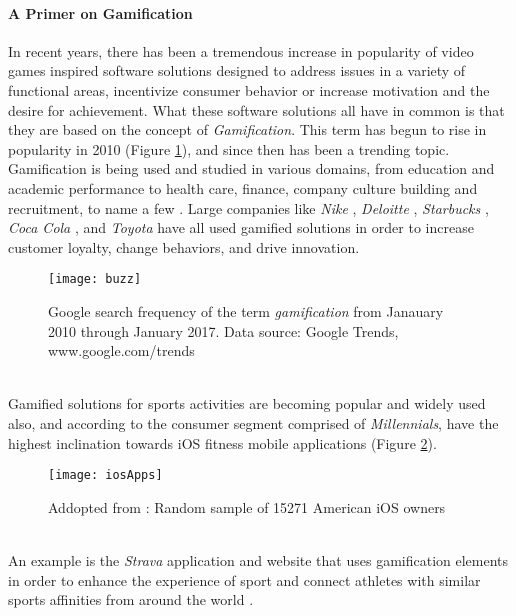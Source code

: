 \paragraph{A Primer on Gamification}
In recent years, there has been a tremendous increase in popularity of video games inspired software solutions designed to address issues in a variety of functional areas, incentivize consumer behavior or increase motivation and the desire for achievement. What these software solutions all have in common is that they are based on the concept of \textit{Gamification}. This term has begun to rise in popularity in 2010 (Figure \ref{fig:buzz}), and since then has been a trending topic. %
Gamification is being used and studied in various domains, from education and academic performance to health care, finance, company culture building and recruitment, to name a few \cite{gamificationExamples, gamificationWiki, enterpriseGamify}. Large companies like \textit{Nike} \cite{nikePlus}, \textit{Deloitte} \cite{deloitte}, \textit{Starbucks} \cite{starbucks}, \textit{Coca Cola} \cite{coke}, and \textit{Toyota} \cite{toyota} have all used gamified solutions in order to increase customer loyalty, change behaviors, and drive innovation. \pagebreak 
\begin{figure}[h]
    \centering
    \texttt{[image: buzz]}
    \caption{Google search frequency of the term \textit{gamification} from Janauary 2010 through January 2017. Data source: Google Trends, www.google.com/trends}
    \label{fig:buzz}
\end{figure}\\
Gamified solutions for sports activities are becoming popular and widely used also, and according to \cite{iosPopulatity} the consumer segment comprised of \textit{Millennials}, have the highest inclination towards iOS fitness mobile applications (Figure \ref{fig:iosApps}). 
\begin{figure}[h]
    \centering
    \texttt{[image: iosApps]}
    \caption{Addopted from \cite{iosPopulatity}: Random sample of 15271 American iOS owners}
    \label{fig:iosApps}
\end{figure}\\
An example is the \textit{Strava} application and website that uses gamification elements in order to enhance the experience of sport and connect athletes with similar sports affinities from around the world \cite{strava}. %
